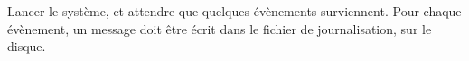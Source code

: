 {Lancer le système, et attendre que quelques évènements surviennent.}
{Pour chaque évènement, un message doit être écrit dans le fichier de
journalisation, sur le disque.}

